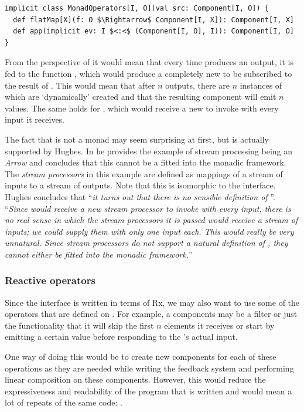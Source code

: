 \begin{lstlisting}[style=InlineScalaStyle]
implicit class MonadOperators[I, O](val src: Component[I, O]) {
  def flatMap[X](f: O $\Rightarrow$ Component[I, X]): Component[I, X]
  def app(implicit ev: I $<:<$ (Component[I, O], I)): Component[I, O]
}
\end{lstlisting}

From the perspective of  it would mean that every time  produces an output, it is fed to the function , which would produce a completely new \comp to be subscribed to the result of . This would mean that after $n$ outputs, there are $n$ instances of \comp which are `dynamically' created and that the resulting component will emit $n$ values. The same holds for , which would receive a new \comp to invoke with every input it receives.

The fact that \comp is not a monad may seem surprising at first, but is actually supported by Hughes. In \cite{hughes2000-arrows} he provides the example of stream processing being an \textit{Arrow} and concludes that this cannot be a fitted into the monadic framework. The \textit{stream processors} in this example are defined as mappings of a stream of inputs to a stream of outputs. Note that this is isomorphic to the \comp interface. Hughes concludes that ``\textit{it turns out that there is no sensible definition of }''. ``\textit{Since  would receive a new stream processor to invoke with every input, there is no real sense in which the stream processors it is passed would receive a \textit{stream} of inputs; we could supply them with only one input each. This would really be very unnatural. Since stream processors do not support a natural definition of , they cannot either be fitted into the monadic framework.}''

\subsubsection{Reactive operators}
Since the \comp interface is written in terms of Rx, we may also want to use some of the operators that are defined on \obs. For example, a components may be a filter or just the functionality that it will skip the first $n$ elements it receives or start by emitting a certain value before responding to the \comp's actual input.

One way of doing this would be to create new components for each of these operations as they are needed while writing the feedback system and performing linear composition on these components. However, this would reduce the expressiveness and readability of the program that is written and would mean a lot of repeats of the same code: .

